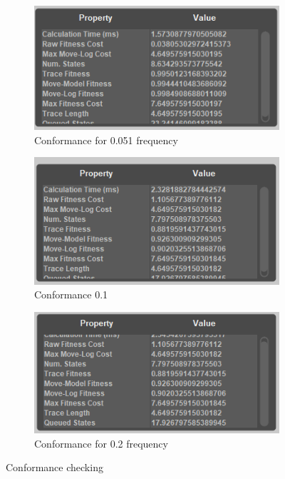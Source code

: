 \begin{figure}[h]
\centering
\begin{subfigure}{.3\textwidth}
  \centering
  \includegraphics[width=\linewidth]{App_Conformance0-051.PNG}
  \caption{Conformance for 0.051 frequency}
  \label{fig:APP_Conf0-051}
\end{subfigure}%
\begin{subfigure}{.3\textwidth}
  \centering
  \includegraphics[width=\linewidth]{App_Conformance0-1.PNG}
  \caption{Conformance 0.1}
  \label{fig:APP_Conf0-1}
\end{subfigure}
\begin{subfigure}{.3\textwidth}
  \centering
  \includegraphics[width=\linewidth]{App_Conformance0-2.PNG}
  \caption{Conformance for 0.2 frequency}
  \label{fig:APP_Conf0-2}
\end{subfigure}
\caption{Conformance checking}
\label{fig:App_Conf}
\end{figure}

